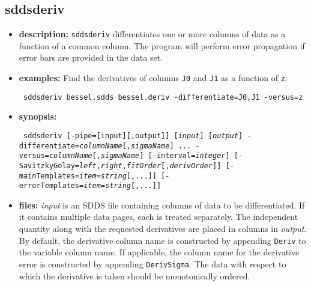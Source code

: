 \begin{latexonly}
\newpage
\end{latexonly}
\subsection{sddsderiv}
\label{sddsderiv}

\begin{itemize}
\item {\bf description:}
{\tt sddsderiv} differentiates one or more columns of data as a function of a common
column.  The program will perform error propagation if error bars are provided in 
the data set.
\item {\bf examples:} 
Find the derivatives of columns {\tt J0} and {\tt J1} as a function of {\tt z}:
\begin{flushleft}{\tt
sddsderiv bessel.sdds bessel.deriv -differentiate=J0,J1 -versus=z
}\end{flushleft}
\item {\bf synopsis:} 
\begin{flushleft}{\tt
sddsderiv [-pipe=[input][,output]] [{\em input}] [{\em output}]
-differentiate={\em columnName}[,{\em sigmaName}] ...
-versus={\em columnName}[,{\em sigmaName}] [-interval={\em integer}]
[-SavitzkyGolay={\em left},{\em right},{\em fitOrder}[,{\em derivOrder}]]
[-mainTemplates={\em item}={\em string}[,...]] 
[-errorTemplates={\em item}={\em string}[,...]] 
}\end{flushleft}
\item {\bf files:}
{\em input} is an SDDS file containing columns of data to be
differentiated.  If it contains multiple data pages, each is treated
separately. The independent quantity along with the requested derivatives
are placed in columns in {\em output}.  By default, the
derivative column name is constructed by appending {\tt Deriv} to the
variable column name.  If applicable, the column name for the
derivative error is constructed by appending {\tt DerivSigma}.  The data with
respect to which the derivative is taken should be monotonically ordered.


\end{itemize}
